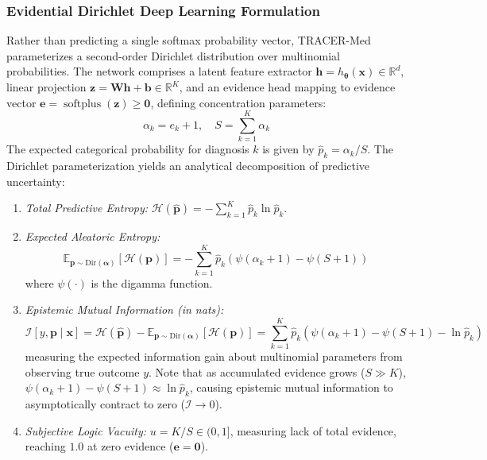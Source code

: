 \documentclass[pdflatex,sn-vancouver-num,referee,lineno]{sn-jnl}
\theoremstyle{thmstyleone}
\theoremstyle{thmstylethree}
\begin{document}
\subsubsection{Evidential Dirichlet Deep Learning Formulation}
Rather than predicting a single softmax probability vector, TRACER-Med parameterizes a second-order Dirichlet distribution over multinomial probabilities. The network comprises a latent feature extractor $\mathbf{h} = h_{\boldsymbol{\theta}}(\mathbf{x}) \in \mathbb{R}^d$, linear projection $\mathbf{z} = \mathbf{W}\mathbf{h} + \mathbf{b} \in \mathbb{R}^K$, and an evidence head mapping to evidence vector $\mathbf{e} = \operatorname{softplus}(\mathbf{z}) \ge \mathbf{0}$, defining concentration parameters:
\begin{equation}
    \alpha_k = e_k + 1, \quad S = \sum_{k=1}^K \alpha_k
\end{equation}
The expected categorical probability for diagnosis $k$ is given by $\hat{p}_k = \alpha_k / S$. The Dirichlet parameterization yields an analytical decomposition of predictive uncertainty:
\begin{enumerate}
    \item \emph{Total Predictive Entropy:} $\mathcal{H}(\hat{\mathbf{p}}) = -\sum_{k=1}^K \hat{p}_k \ln \hat{p}_k$.
    \item \emph{Expected Aleatoric Entropy:}
    \begin{equation}
        \mathbb{E}_{\mathbf{p} \sim \text{Dir}(\boldsymbol{\alpha})}[\mathcal{H}(\mathbf{p})] = -\sum_{k=1}^K \hat{p}_k \left(\psi(\alpha_k + 1) - \psi(S + 1)\right)
    \end{equation}
    where $\psi(\cdot)$ is the digamma function.
    \item \emph{Epistemic Mutual Information (in nats):}
    \begin{equation}
        \mathcal{I}[y, \mathbf{p} \mid \mathbf{x}] = \mathcal{H}(\hat{\mathbf{p}}) - \mathbb{E}_{\mathbf{p} \sim \text{Dir}(\boldsymbol{\alpha})}[\mathcal{H}(\mathbf{p})] = \sum_{k=1}^K \hat{p}_k \left(\psi(\alpha_k + 1) - \psi(S + 1) - \ln \hat{p}_k\right)
    \end{equation}
    measuring the expected information gain about multinomial parameters from observing true outcome $y$. Note that as accumulated evidence grows ($S \gg K$), $\psi(\alpha_k + 1) - \psi(S + 1) \approx \ln \hat{p}_k$, causing epistemic mutual information to asymptotically contract to zero ($\mathcal{I} \to 0$).
    \item \emph{Subjective Logic Vacuity:} $u = K / S \in (0, 1]$, measuring lack of total evidence, reaching $1.0$ at zero evidence ($\mathbf{e} = \mathbf{0}$).
\end{enumerate}
\end{document}
